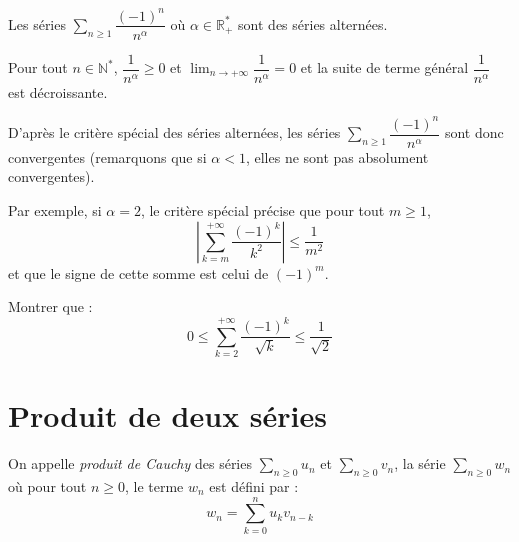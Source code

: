 \documentclass[a4paper,10pt]{report}
\newcommand{\Sum}[2]{\ensuremath{\textstyle{\sum\limits_{#1}^{#2}}}}
\begin{document}
\newpage

$\phantom{}$

\vspace{7cm}

\begin{ex} Les séries $\Sum{n \geq 1}{} \dfrac{(-1)^n}{n^{\alpha}}$ où $\alpha \in \mathbb{R}_+^{*}$ sont des séries alternées.

\noindent Pour tout $n \in \mathbb{N}^*$, $\dfrac{1}{n^{\alpha}} \geq 0$ et $\lim_{n \rightarrow + \infty} \dfrac{1}{n^{\alpha}} = 0$ et la suite de terme général $\dfrac{1}{n^{\alpha}}$ est décroissante. 

\noindent D'après le critère spécial des séries alternées, les séries $\Sum{n \geq 1}{} \dfrac{(-1)^n}{n^{\alpha}}$ sont donc convergentes (remarquons que si $\alpha <1$, elles ne sont pas absolument convergentes).

\medskip

\noindent Par exemple, si $\alpha = 2$, le critère spécial précise que pour tout $m \geq 1$,
$$ \left\vert \sum_{k=m}^{+ \infty}\dfrac{(-1)^k}{k^{2}}  \right\vert \leq \frac{1}{m^2}$$
et que le signe de cette somme est celui de $(-1)^m$.
\end{ex}

\begin{exa} Montrer que :
$$ 0 \leq \sum_{k=2}^{+ \infty}\dfrac{(-1)^k}{\sqrt{k}} \leq \frac{1}{\sqrt{2}}$$
\end{exa}


\section{Produit de deux séries}

\begin{defin} On appelle \textit{produit de Cauchy} des séries $\Sum{n \geq 0}{} u_n$ et $\Sum{n \geq 0}{} v_n$, la série $\Sum{n \geq 0}{} w_n$ où pour tout $n \geq 0$, le terme $w_n$ est défini par :
$$w_n = \sum_{k=0}^n u_k v_{n-k}$$
\end{defin}
\end{document}
